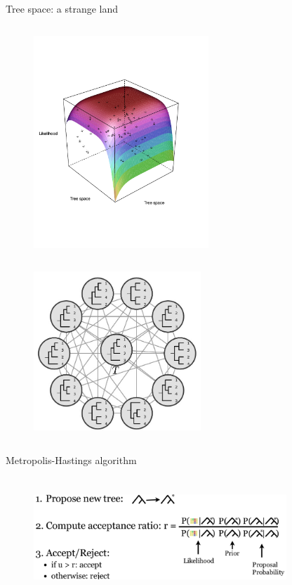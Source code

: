 \documentclass[newPxFont,numfooter,sectionpages]{beamer}
\begin{document}
\begin{frame}{Tree space: a strange land}
 \begin{column}{0.55\textwidth}
\begin{figure}
	\includegraphics[width=\textwidth,height=8cm]{figures/treespace_5taxa_likelihood.pdf}
\end{figure}
\end{column}
 \begin{column}{0.45\textwidth}
\begin{figure}
	\includegraphics[width=\textwidth,height=6cm]{figures/spr_graph.jpg}
\end{figure}
\end{column}
\end{frame}

\begin{frame}{Metropolis-Hastings algorithm}
\begin{figure}
	\includegraphics[width=0.85\textwidth,height=4.5cm]{figures/MH.pdf} 
\end{figure}
\end{frame}
\end{document}
